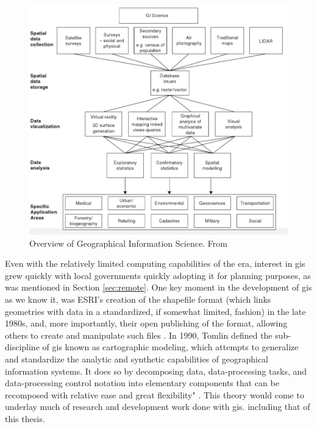 \begin{figure}[h]
	\centering
	\includegraphics[scale=0.4]{Figures/chap2/GIScience.png}
	\caption[Overview of Geographical Information Science]{Overview of Geographical Information Science. From \cite{fotheringhamGeographicInformationScience2007}}
	\label{fig:giscience}
\end{figure}


Even with the relatively limited computing capabilities of the era, interest in \ac{gis} grew quickly with local governments quickly adopting it for planning purposes, as was mentioned in Section \ref{sec:remote}. One key moment in the development of \ac{gis} as we know it, was ESRI's creation of the shapefile format (which links geometries with data in a standardized, if somewhat limited, fashion) in the late 1980s, and, more importantly, their open publishing of the format, allowing others to create and manipulate such files \cite{goodchildModelingEarth2011}. In 1990, Tomlin defined the sub-discipline of \ac{gis} known as cartographic modeling, which attempts to generalize and standardize the analytic and synthetic capabilities of geographical information systems. It does so by decomposing data, data-processing tasks, and data-processing control notation into elementary components that can be recomposed with relative ease and great flexibility" \cite{tomlinGISCartographicModeling2012}. This theory would come to underlay much of research and development work done with \ac{gis}. including that of this thesis. 

